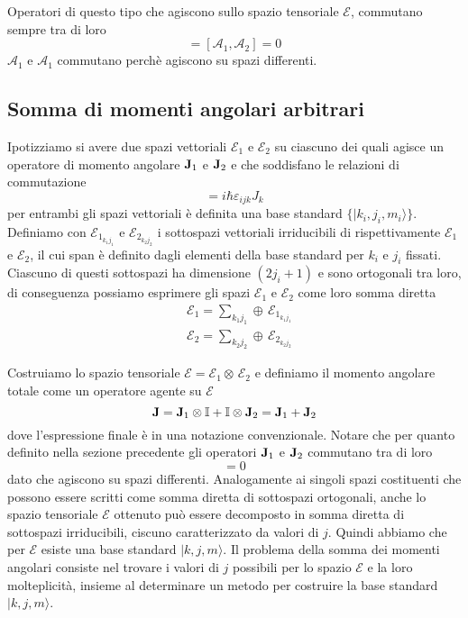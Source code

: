 Operatori di questo tipo che agiscono sullo spazio tensoriale $\mathcal{E}$, commutano sempre tra di loro
\begin{equation*}
	[\hat{A}_1 \otimes 1,1 \otimes \mathcal{A}_2] = [\mathcal{A}_1,\mathcal{A}_2] =0
\end{equation*}
$\mathcal{A}_1 $ e $\mathcal{A}_1$ commutano perch\`e agiscono su spazi differenti.

\subsection{Somma di momenti angolari arbitrari}

Ipotizziamo si avere due spazi vettoriali $\mathcal{E}_1$ e $\mathcal{E}_2$ su ciascuno dei quali agisce un operatore di momento angolare $\bold{J}_1$ e $\bold{J}_2$ e che soddisfano le relazioni di commutazione
\begin{equation*}
	[J_i,J_j] = i \hbar \varepsilon_{ijk}J_k 
\end{equation*}
per entrambi gli spazi vettoriali \`e definita una base standard $\{|k_i,j_i,m_i \rangle\}$. Definiamo con $\mathcal{E}_{1_{k_1j_1}}$ e $\mathcal{E}_{2_{k_2j_2}}$ i sottospazi vettoriali irriducibili di rispettivamente $\mathcal{E}_1$ e $\mathcal{E}_2$, il cui span \`e definito dagli elementi della base standard per $k_i$ e $j_i$ fissati. Ciascuno di questi sottospazi ha dimensione $(2j_i+1)$ e sono ortogonali tra loro, di conseguenza possiamo esprimere gli spazi $\mathcal{E}_1$ e $\mathcal{E}_2$ come loro somma diretta 
\begin{align*}
	& \mathcal{E}_1 = \sum_{k_1j_1} \oplus \, \mathcal{E}_{1_{k_1j_1}} \\[0.4cm]
	& \mathcal{E}_2 = \sum_{k_2j_2} \oplus \, \mathcal{E}_{2_{k_2j_2}}
\end{align*} 

Costruiamo lo spazio tensoriale $\mathcal{E} = \mathcal{E}_1 \otimes \,\mathcal{E}_2$ e definiamo il momento angolare totale come un operatore agente su $\mathcal{E}$ 
\begin{equation*}
	\bold{J} = \bold{J}_1 \otimes \mathbb{I} + \mathbb{I} \otimes \bold{J}_{2} = \bold{J}_1 + \bold{J}_2
\end{equation*}
dove l'espressione finale \`e in una notazione convenzionale. Notare che per quanto definito nella sezione precedente gli operatori $\bold{J}_1 $ e $\bold{J}_2$ commutano tra di loro
\begin{equation*}
	[\bold{J}_1,\bold{J}_2] = 0
\end{equation*}
dato che agiscono su spazi differenti. Analogamente ai singoli spazi costituenti che possono essere scritti come somma diretta di sottospazi ortogonali, anche lo spazio tensoriale $\mathcal{E}$ ottenuto pu\`o essere decomposto in somma diretta di sottospazi irriducibili, ciscuno caratterizzato da valori di $j$. Quindi abbiamo che per $\mathcal{E}$ esiste una base standard $|k,j,m \rangle$. Il problema della somma dei momenti angolari consiste nel trovare i valori di $j$ possibili per lo spazio $\mathcal{E}$ e la loro molteplicit\`a, insieme al determinare un metodo per costruire la base standard $|k,j,m \rangle $.

